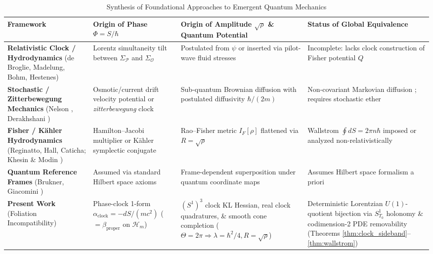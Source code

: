 \documentclass[11pt, a4paper]{article}
\theoremstyle{definition}
\begin{document}
\begin{table}[htbp]
\centering
\caption{Synthesis of Foundational Approaches to Emergent Quantum Mechanics}
\label{tab:synthesis}
\vspace{0.5em}
\footnotesize
\setlength{\tabcolsep}{4pt}
\begin{tabularx}{\textwidth}{>{\raggedright\arraybackslash}p{} >{\raggedright\arraybackslash}X >{\raggedright\arraybackslash}X >{\raggedright\arraybackslash}X}
\toprule
\textbf{Framework} & \textbf{Origin of Phase $\Phi = S/\hbar$} & \textbf{Origin of Amplitude $\sqrt{\rho}$ \& Quantum Potential} & \textbf{Status of Global Equivalence} \\
\midrule
\textbf{Relativistic Clock / Hydrodynamics} (de Broglie, Madelung, Bohm, Hestenes) & Lorentz simultaneity tilt between $\Sigma_{\mathcal{P}}$ and $\Sigma_{\mathcal{O}}$ & Postulated from $\psi$ or inserted via pilot-wave fluid stresses & Incomplete: lacks clock construction of Fisher potential $Q$ \\
\addlinespace
\textbf{Stochastic / Zitterbewegung Mechanics} (Nelson \cite{Nelson1966}, Derakhshani \cite{Derakhshani2018}) & Osmotic/current drift velocity potential or \textit{zitterbewegung} clock & Sub-quantum Brownian diffusion with postulated diffusivity $\hbar/(2m)$ & Non-covariant Markovian diffusion \cite{Gaveau1984}; requires stochastic ether \\
\addlinespace
\textbf{Fisher / K\"{a}hler Hydrodynamics} (Reginatto, Hall, Caticha; Khesin \& Modin \cite{Khesin2018, Khesin2026}) & Hamilton--Jacobi multiplier or K\"{a}hler symplectic conjugate & Rao--Fisher metric $I_F[\rho]$ flattened via $R = \sqrt{\rho}$ & Wallstrom $\oint dS = 2\pi n\hbar$ imposed or analyzed non-relativistically \\
\addlinespace
\textbf{Quantum Reference Frames} (Brukner, Giacomini \cite{Giacomini2019}) & Assumed via standard Hilbert space axioms & Frame-dependent superposition under quantum coordinate maps & Assumes Hilbert space formalism a priori \\
\addlinespace
\textbf{Present Work} (Foliation Incompatibility) & Phase-clock 1-form $\alpha_{\text{clock}} = -dS/(mc^2)$ ($= \beta_{\text{proper}}$ on $\mathcal{H}_m$) & $(S^1)^3$ clock KL Hessian, real clock quadratures, \& smooth cone completion ($\Theta = 2\pi \Rightarrow \lambda = \hbar^2/4, R = \sqrt{\rho}$) & Deterministic Lorentzian $U(1)$-quotient bijection via $S^1_{T_0}$ holonomy \& codimension-2 PDE removability (Theorems \ref{thm:clock_sideband}--\ref{thm:wallstrom}) \\
\bottomrule
\end{tabularx}
\end{table}
\end{document}
